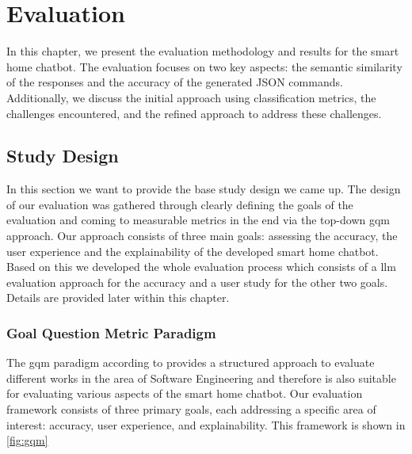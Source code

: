 
\chapter{Evaluation}
\label{chap:evaluation}

In this chapter, we present the evaluation methodology and results for the smart home chatbot. The evaluation focuses on two key aspects: the semantic similarity of the responses and the accuracy of the generated JSON commands. Additionally, we discuss the initial approach using classification metrics, the challenges encountered, and the refined approach to address these challenges.

\section{Study Design}
In this section we want to provide the base study design we came up.
The design of our evaluation was gathered through clearly defining the goals of the evaluation and coming to measurable metrics in the end via the top-down \gls{gqm} approach.
Our approach consists of three main goals: assessing the accuracy, the user experience and the explainability of the developed smart home chatbot.
Based on this we developed the whole evaluation process which consists of a \gls{llm} evaluation approach for the accuracy and a user study for the other two goals.
Details are provided later within this chapter.

\subsection{Goal Question Metric Paradigm}
The \gls{gqm} paradigm according to \citet{caldiera1994goal} provides a structured approach to evaluate different works in the area of Software Engineering and therefore is also suitable for evaluating various aspects of the smart home chatbot. 
Our evaluation framework consists of three primary goals, each addressing a specific area of interest: accuracy, user experience, and explainability.
This framework is shown in \cref{fig:gqm}

